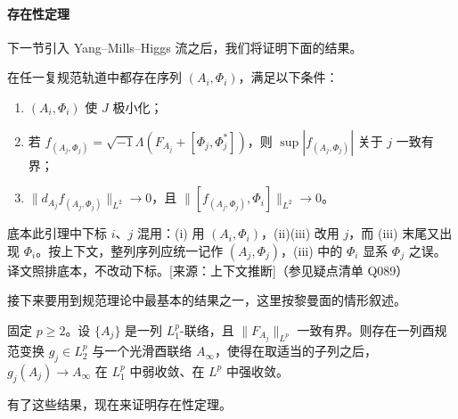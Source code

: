 \paragraph{存在性定理}
下一节引入 Yang–Mills–Higgs 流之后，我们将证明下面的结果。

\begin{lemma}
在任一复规范轨道中都存在序列 $(A_i,\Phi_i)$，满足以下条件：
\begin{enumerate}[label=(\roman*), leftmargin=2.6em, itemsep=0.2em]
\item $(A_i,\Phi_i)$ 使 $J$ 极小化；
\item 若 $f_{(A_j,\Phi_j)}=\sqrt{-1}\Lambda(F_{A_j}+[\Phi_j,\Phi_j^*])$，则 $\sup|f_{(A_j,\Phi_j)}|$ 关于 $j$ 一致有界；
\item $\|d_{A_j}f_{(A_j,\Phi_j)}\|_{L^2}\to0$，且 $\|[f_{(A_j,\Phi_j)},\Phi_i]\|_{L^2}\to0$。
\end{enumerate}
\end{lemma}

\begin{annote}
底本此引理中下标 $i$、$j$ 混用：(i) 用 $(A_i,\Phi_i)$，(ii)(iii) 改用 $j$，而 (iii) 末尾又出现 $\Phi_i$。按上下文，整列序列应统一记作 $(A_j,\Phi_j)$，(iii) 中的 $\Phi_i$ 显系 $\Phi_j$ 之误。译文照排底本，不改动下标。[来源：上下文推断]（参见疑点清单 Q089）
\end{annote}

接下来要用到规范理论中最基本的结果之一，这里按黎曼面的情形叙述。

\begin{proposition}[Uhlenbeck，{[64]}]
固定 $p\ge2$。设 $\{A_j\}$ 是一列 $L^p_1$-联络，且 $\|F_{A_j}\|_{L^p}$ 一致有界。则存在一列酉规范变换 $g_j\in L^p_2$ 与一个光滑酉联络 $A_\infty$，使得在取适当的子列之后，$g_j(A_j)\to A_\infty$ 在 $L^p_1$ 中弱收敛、在 $L^p$ 中强收敛。
\end{proposition}

有了这些结果，现在来证明存在性定理。


